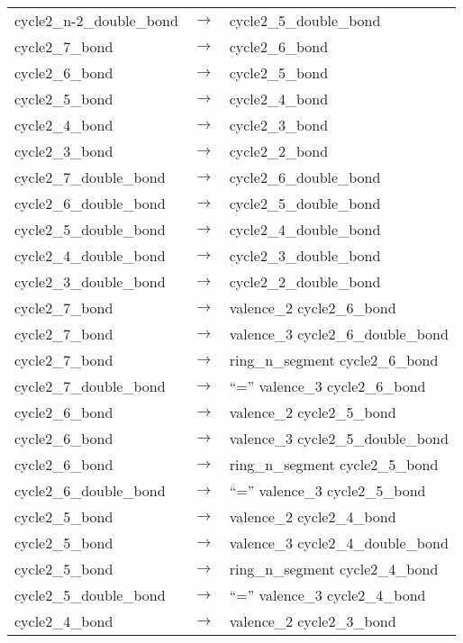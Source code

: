 \documentclass[../Document.tex]{subfiles}
\begin{document}
\begin{longtable}{m{} p{} p{}}
    cycle2\_n-2\_double\_bond & $\rightarrow$ & cycle2\_5\_double\_bond \\
    cycle2\_7\_bond & $\rightarrow$ & cycle2\_6\_bond \\
    cycle2\_6\_bond & $\rightarrow$ & cycle2\_5\_bond \\
    cycle2\_5\_bond & $\rightarrow$ & cycle2\_4\_bond \\
    cycle2\_4\_bond & $\rightarrow$ & cycle2\_3\_bond \\
    cycle2\_3\_bond & $\rightarrow$ & cycle2\_2\_bond \\
    cycle2\_7\_double\_bond & $\rightarrow$ & cycle2\_6\_double\_bond \\
    cycle2\_6\_double\_bond & $\rightarrow$ & cycle2\_5\_double\_bond \\
    cycle2\_5\_double\_bond & $\rightarrow$ & cycle2\_4\_double\_bond \\
    cycle2\_4\_double\_bond & $\rightarrow$ & cycle2\_3\_double\_bond \\
    cycle2\_3\_double\_bond & $\rightarrow$ & cycle2\_2\_double\_bond \\
    cycle2\_7\_bond & $\rightarrow$ & valence\_2 cycle2\_6\_bond \\
    cycle2\_7\_bond & $\rightarrow$ & valence\_3 cycle2\_6\_double\_bond \\
    cycle2\_7\_bond & $\rightarrow$ & ring\_n\_segment cycle2\_6\_bond \\
    cycle2\_7\_double\_bond & $\rightarrow$ & ``='' valence\_3 cycle2\_6\_bond \\
    cycle2\_6\_bond & $\rightarrow$ & valence\_2 cycle2\_5\_bond \\
    cycle2\_6\_bond & $\rightarrow$ & valence\_3 cycle2\_5\_double\_bond \\
    cycle2\_6\_bond & $\rightarrow$ & ring\_n\_segment cycle2\_5\_bond \\
    cycle2\_6\_double\_bond & $\rightarrow$ & ``='' valence\_3 cycle2\_5\_bond \\
    cycle2\_5\_bond & $\rightarrow$ & valence\_2 cycle2\_4\_bond \\
    cycle2\_5\_bond & $\rightarrow$ & valence\_3 cycle2\_4\_double\_bond \\
    cycle2\_5\_bond & $\rightarrow$ & ring\_n\_segment cycle2\_4\_bond \\
    cycle2\_5\_double\_bond & $\rightarrow$ & ``='' valence\_3 cycle2\_4\_bond \\
    cycle2\_4\_bond & $\rightarrow$ & valence\_2 cycle2\_3\_bond \\

\end{longtable}
\end{document}
